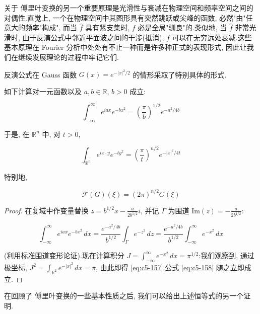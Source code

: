 关于 傅里叶变换的另一个重要原理是光滑性与衰减在物理空间和频率空间之间的对偶性.直觉上, 一个在物理空间中其图形具有突然跳跃或尖峰的函数, 必然"由"任意大的频率"构成", 而当 $\hat{f}$ 具有紧支集时, $f$ 必是全局"驯良"的.类似地, 当 $\hat{f}$ 非常光滑时, 由于反演公式中邻近平面波之间的干涉(抵消), $f$ 可以在无穷远处衰减.这些基本原理在 Fourier 分析中处处有不止一种而是许多种正式的表现形式, 因此让我们在继续发展理论的过程中牢记它们.

反演公式在 Gauss 函数 $G(x) = e^{-|x|^2/2}$ 的情形采取了特别具体的形式.

\begin{lemma}\label{lem:c5-1.1}
如下计算对一元函数以及 $a, b \in \mathbb{R}$, $b > 0$ 成立:

\begin{equation}
\int_{-\infty}^{\infty} e^{iax}e^{-bx^2} = \left(\frac{\pi}{b}\right)^{1/2}e^{-a^2/4b}\label{eq:c5-157}
\end{equation}

于是, 在 $\mathbb{R}^n$ 中, 对 $t > 0$,

\begin{equation}
\int_{\mathbb{R}^n} e^{ix\cdot y}e^{-ty^2} = \left(\frac{\pi}{t}\right)^{n/2}e^{-|x|^2/4t}\label{eq:c5-158}
\end{equation}

特别地,

\begin{equation}
\mathcal{F}(G)(\xi) = (2\pi)^{n/2}G(\xi)\label{eq:c5-159}
\end{equation}
\end{lemma}

\begin{proof}
在复域中作变量替换 $z = b^{1/2}x - \frac{a}{2b^{1/2}}i$, 并记 $\Gamma$ 为围道 $\mathrm{Im}(z) = -\frac{a}{2b^{1/2}}$:

\[
\int_{-\infty}^{\infty} e^{iax}e^{-bx^2}\, dx = \frac{e^{-a^2/4b}}{b^{1/2}}\int_\Gamma e^{-z^2}\, dz = \frac{e^{-a^2/4b}}{b^{1/2}}\int_{-\infty}^{\infty} e^{-x^2}\, dx
\]

(利用标准围道变形论证).现在计算积分 $J = \int_{-\infty}^{\infty} e^{-x^2}\, dx = \pi^{1/2}$:我们观察到, 通过极坐标, $J^2 = \int_{\mathbb{R}^2} e^{-|x|^2}\, dx = \pi$, 由此即得 \eqref{eq:c5-157}.公式 \eqref{eq:c5-158} 随之立即成立.
\end{proof}

在回顾了 傅里叶变换的一些基本性质之后, 我们可以给出上述恒等式的另一个证明.

